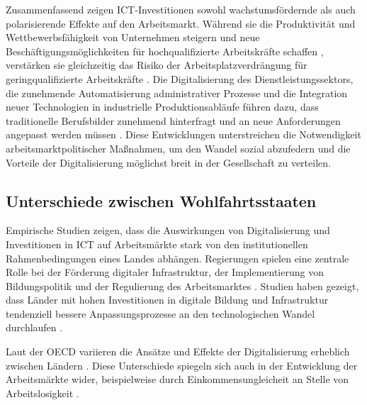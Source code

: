 Zusammenfassend zeigen \ac{ICT}-Investitionen sowohl wachstumsfördernde als auch 
polarisierende Effekte auf den Arbeitsmarkt. Während sie die Produktivität und 
Wettbewerbsfähigkeit von Unternehmen steigern und neue Beschäftigungsmöglichkeiten für 
hochqualifizierte Arbeitskräfte schaffen \parencite[vgl.][S. 19–20]{oecd2020digital}, 
verstärken sie gleichzeitig das Risiko der Arbeitsplatzverdrängung für geringqualifizierte 
Arbeitskräfte \parencite[vgl.][S. 48–52]{brynjolfsson2014thesecond}. Die Digitalisierung des 
Dienstleistungssektors, die zunehmende Automatisierung administrativer Prozesse und die 
Integration neuer Technologien in industrielle Produktionsabläufe führen dazu, dass traditionelle 
Berufsbilder zunehmend hinterfragt und an neue Anforderungen angepasst werden müssen 
\parencite[vgl.][S. 20]{oecd2020digital}. Diese 
Entwicklungen unterstreichen die Notwendigkeit arbeitsmarktpolitischer Maßnahmen, um den 
Wandel sozial abzufedern und die Vorteile der Digitalisierung möglichst breit in der 
Gesellschaft zu verteilen.


\subsection{Unterschiede zwischen Wohlfahrtsstaaten}

Empirische Studien zeigen, dass die Auswirkungen von Digitalisierung und Investitionen in 
\ac{ICT} auf Arbeitsmärkte stark von den institutionellen Rahmenbedingungen eines Landes 
abhängen. Regierungen spielen eine zentrale Rolle bei der Förderung digitaler Infrastruktur, der 
Implementierung von Bildungspolitik und der Regulierung des Arbeitsmarktes 
\parencite[vgl.][S. 4–5]{hall2001varieties}. Studien haben gezeigt, dass Länder mit hohen 
Investitionen in digitale Bildung und Infrastruktur tendenziell bessere Anpassungsprozesse an den 
technologischen Wandel durchlaufen \parencite[vgl.][S. 109–111]{oecd2020digital}.

Laut der \ac{OECD} variieren die Ansätze und Effekte der Digitalisierung erheblich zwischen 
Ländern \parencite[vgl.][S. 95–98]{oecd2020digital}. Diese Unterschiede spiegeln sich auch in der 
Entwicklung der Arbeitsmärkte wider, beispielweise durch Einkommensungleicheit an Stelle von  
Arbeitslosigkeit \parencite[vgl.][S. 56–58]{nickell1997unemployment}.

